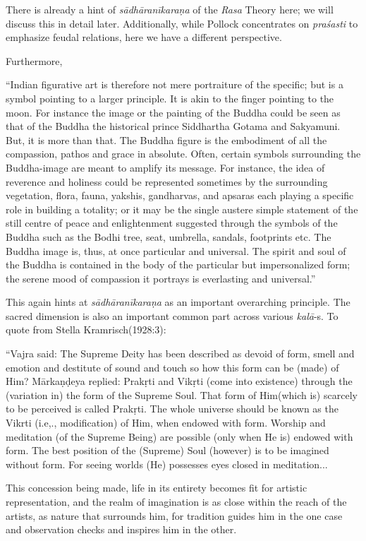 There is already a hint of \textsl{sādhāranīkaraṇa} of the \textsl{Rasa} Theory here; we will discuss this in detail later. Additionally, while Pollock concentrates on \textsl{praśasti} to emphasize feudal relations, here we have a different perspective. 

Furthermore, 

\begin{myquote}
“Indian figurative art is therefore not mere portraiture of the specific; but is a symbol pointing to a larger principle. It is akin to the finger pointing to the moon. For instance the image or the painting of the Buddha could be seen as that of the Buddha the historical prince Siddhartha Gotama and Sakyamuni. But, it is more than that. The Buddha figure is the embodiment of all the compassion, pathos and grace in absolute. Often, certain symbols surrounding the Buddha-image are meant to amplify its message. For instance, the idea of reverence and holiness could be represented sometimes by the surrounding vegetation, flora, fauna, yakshis, gandharvas, and apsaras each playing a specific role in building a totality; or it may be the single austere simple statement of the still centre of peace and enlightenment suggested through the symbols of the Buddha such as the Bodhi tree, seat, umbrella, sandals, footprints etc. The Buddha image is, thus, at once particular and universal. The spirit and soul of the Buddha is contained in the body of the particular but impersonalized form; the serene mood of compassion it portrays is everlasting and universal.” 
\end{myquote}

This again hints at \textsl{sādhāranīkaraṇa} as an important overarching principle. The sacred dimension is also an important common part across various \textsl{kalā}-s. To quote from Stella Kramrisch(1928:3):

\begin{myquote}
“Vajra said: The Supreme Deity has been described as devoid of form, smell and emotion and destitute of sound and touch so how this form can be (made) of Him? Mārkaṇḍeya replied: Prakṛti and Vikṛti (come into existence) through the (variation in) the form of the Supreme Soul. That form of Him(which is) scarcely to be perceived is called Prakṛti. The whole universe should be known as the Vikrti (i.e,., modification) of Him, when endowed with form. Worship and meditation (of the Supreme Being) are possible (only when He is) endowed with form. The best position of the (Supreme) Soul (however) is to be imagined without form. For seeing worlds (He) possesses eyes closed in meditation... 

This concession being made, life in its entirety becomes fit for artistic representation, and the realm of imagination is as close within the reach of the artists, as nature that surrounds him, for tradition guides him in the one case and observation checks and inspires him in the other. 
\end{myquote}


